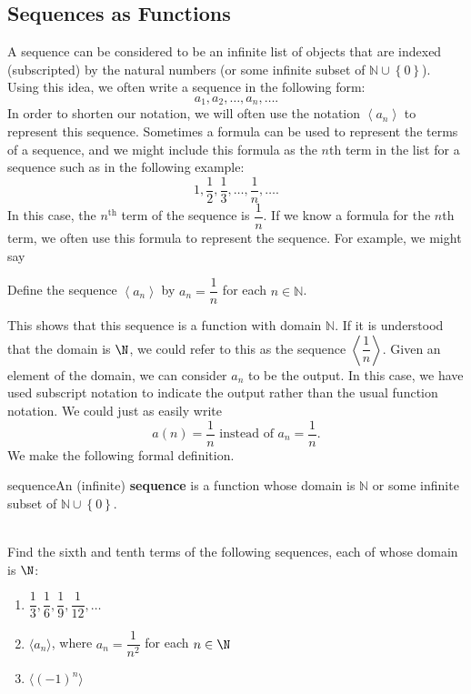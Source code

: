 \subsection*{Sequences as Functions}
A sequence can be considered to be an infinite list of objects that are indexed (subscripted) by the natural numbers (or some infinite subset of  $\mathbb{N} \cup \left\{ 0 \right\}$).  Using this idea, we often write a sequence in the following form:
\[
a_1 , a_2 ,  \ldots , a_n ,  \ldots .
\]
In order to shorten our notation, we will often use the notation  
$\left\langle {a_n } \right\rangle $
 to represent this sequence.  Sometimes a formula can be used to represent the terms of a sequence, and we might include this formula as the  $n$th  term in the list for a sequence such as in the following example:
\[
1, \frac{1}{2}, \frac{1}{3},  \ldots , \frac{1}{n},  \ldots .
\]
In this case, the  $n^\text{th}$ term of the sequence is  $\dfrac{1}{n}$.  If we know a formula for the  $n$th term, we often use this formula to represent the sequence.  For example, we might say
\begin{center}
Define the sequence  $\left\langle {a_n } \right\rangle $  by  $a_n  = \dfrac{1}{n}$  for each  $n \in \mathbb{N}$.
\end{center}
This shows that this sequence is a function with domain  $\mathbb{N}$.  If it is understood that the domain is $\N$, we could refer to this as the sequence $\left\langle \dfrac{1}{n} \right \rangle$. Given an element of the domain, we can consider  $a_n $ to be the output.  In this case, we have used subscript notation to indicate the output rather than the usual function notation.  We could just as easily write  
\[
a( n ) = \frac{1}{n} \text{ instead of } a_n  = \frac{1}{n}.  
\]
We make the following formal definition.
%
\begin{defbox}{sequence}{An (infinite) \textbf{sequence}
%
 is a function whose domain is  $\mathbb{N}$ or some infinite subset of  $\mathbb{N} \cup \left\{ 0 \right\}$.}
\end{defbox}

\begin{prog} \label{pr:sequences} \hfill \\
Find the sixth and tenth terms of the following sequences, each of whose domain is $\N$:
\begin{enumerate}
\item $\dfrac{1}{3}, \dfrac{1}{6}, \dfrac{1}{9}, \dfrac{1}{12}, \ldots$
\item $\langle a_n \rangle$, where $a_n = \dfrac{1}{n^2}$ for each $n \in \N$
\item $\langle (-1)^n \rangle$
\end{enumerate}
\end{prog}
\hbreak

\endinput
